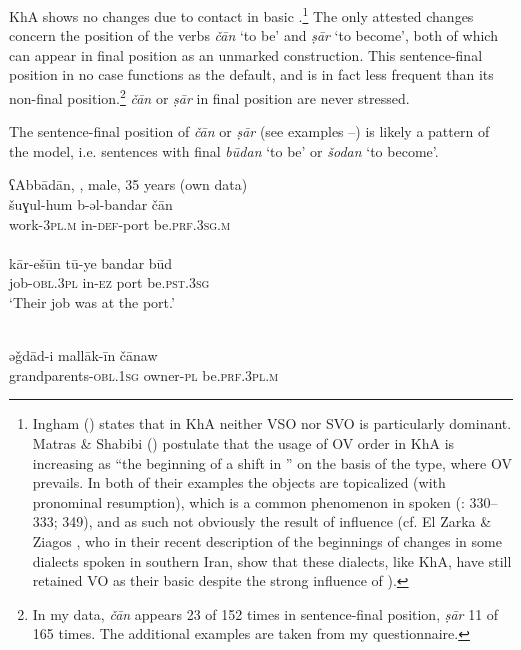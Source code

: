\documentclass[output=paper,nonflat]{langsci/langscibook}
\begin{document}
KhA shows no changes due to contact in basic .\footnote{Ingham (\citeyear[715]{Ingham1991}) states that in KhA neither VSO nor SVO  is particularly dominant. Matras \& Shabibi (\citeyear[147]{MatrasShabibi2007}) postulate that the usage of OV order in KhA is increasing as “the beginning of a shift in ” on the basis of the  type, where OV prevails. In both of their examples the objects are topicalized (with pronominal resumption), which is a common phenomenon in spoken  (\citealt{Brustad2000}: 330–333; 349), and as such not obviously the result of  influence (cf. El Zarka \& Ziagos \citeyear{ElZarkaZiagos2019}, who in their recent description of the beginnings of  changes in some  dialects spoken in southern Iran, show that these dialects, like KhA, have still retained VO as their basic  despite the strong influence of ).}  The only attested  changes concern the position of the verbs \textit{čān} ‘to be’ and \textit{ṣār} ‘to become’, both of which can appear in final position as an unmarked construction. This sentence-final position in no case functions as the default, and is in fact less frequent than its non-final position.\footnote{In my data, \textit{čān} appears 23 of 152 times in sentence-final position, \textit{ṣār} 11 of 165 times. The additional examples are taken from my questionnaire.} \textit{čān} or \textit{ṣār} in final position are never stressed.

The sentence-final position of \textit{čān} or \textit{ṣār} (see examples --) is likely a pattern  of the  model, i.e. sentences with final \textit{būdan} ‘to be’ or \textit{šodan} ‘to become’.

\ea\label{port}
\ea
{ʕAbbādān, , male, 35 years (own data)}\\
\gll šuɣul-hum b-əl-bandar čān\\
     work-\textsc{3pl}.\textsc{m} in-\textsc{def}-port be.\textsc{prf.3sg.m}\\
 
\\
\gll kār-ešūn tū-ye bandar būd\\
     job-\textsc{obl}.3\textsc{pl} in-\textsc{ez} port be.\textsc{pst.3sg}\\
\glt ‘Their job was at the port.’
\z\z

\ea
{}\\
\gll əǧdād-i mallāk-īn čānaw\\
     grandparents-\textsc{obl.1sg} owner-\textsc{pl} be.\textsc{prf.3pl.m}\\
 
\end{document}
